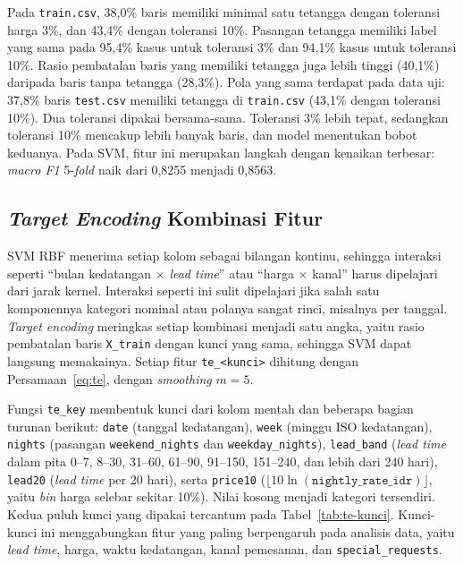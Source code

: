 Pada \texttt{train.csv}, 38,0\% baris memiliki minimal satu tetangga dengan
toleransi harga 3\%, dan 43,4\% dengan toleransi 10\%. Pasangan tetangga memiliki
label yang sama pada 95,4\% kasus untuk toleransi 3\% dan 94,1\% kasus untuk
toleransi 10\%. Rasio pembatalan baris yang memiliki tetangga juga lebih tinggi
(40,1\%) daripada baris tanpa tetangga (28,3\%). Pola yang sama terdapat pada data
uji: 37,8\% baris \texttt{test.csv} memiliki tetangga di \texttt{train.csv}
(43,1\% dengan toleransi 10\%). Dua toleransi dipakai bersama-sama. Toleransi 3\%
lebih tepat, sedangkan toleransi 10\% mencakup lebih banyak baris, dan model
menentukan bobot keduanya. Pada SVM, fitur ini merupakan langkah dengan kenaikan
terbesar: \textit{macro F1} 5-\textit{fold} naik dari 0,8255 menjadi 0,8563.



\subsection{\textit{Target Encoding} Kombinasi Fitur}

SVM RBF menerima setiap kolom sebagai bilangan kontinu, sehingga interaksi seperti
``bulan kedatangan $\times$ \textit{lead time}'' atau ``harga $\times$ kanal''
harus dipelajari dari jarak kernel. Interaksi seperti ini sulit dipelajari jika
salah satu komponennya kategori nominal atau polanya sangat rinci, misalnya per
tanggal. \textit{Target encoding} meringkas setiap kombinasi menjadi satu angka,
yaitu rasio pembatalan baris \texttt{X\_train} dengan kunci yang sama, sehingga
SVM dapat langsung memakainya. Setiap fitur \texttt{te\_<kunci>} dihitung dengan
Persamaan~\ref{eq:te}, dengan \textit{smoothing} $m=5$.

Fungsi \texttt{te\_key} membentuk kunci dari kolom mentah dan beberapa bagian
turunan berikut: \texttt{date} (tanggal kedatangan), \texttt{week} (minggu ISO
kedatangan), \texttt{nights} (pasangan \texttt{weekend\_nights} dan
\texttt{weekday\_nights}), \texttt{lead\_band} (\textit{lead time} dalam pita
0--7, 8--30, 31--60, 61--90, 91--150, 151--240, dan lebih dari 240 hari),
\texttt{lead20} (\textit{lead time} per 20 hari), serta \texttt{price10}
($\lfloor 10\ln(\texttt{nightly\_rate\_idr})\rfloor$, yaitu \textit{bin} harga
selebar sekitar 10\%). Nilai kosong menjadi kategori tersendiri. Kedua puluh
kunci yang dipakai tercantum pada Tabel~\ref{tab:te-kunci}. Kunci-kunci ini
menggabungkan fitur yang paling berpengaruh pada analisis data, yaitu
\textit{lead time}, harga, waktu kedatangan, kanal pemesanan, dan
\texttt{special\_requests}.

